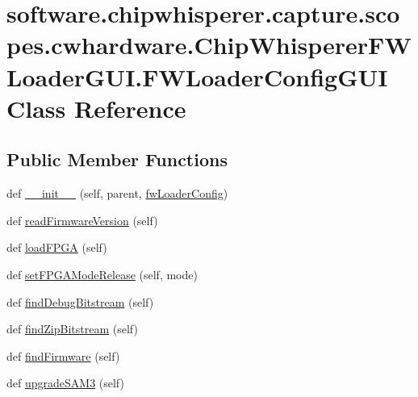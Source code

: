 \hypertarget{classsoftware_1_1chipwhisperer_1_1capture_1_1scopes_1_1cwhardware_1_1ChipWhispererFWLoaderGUI_1_1FWLoaderConfigGUI}{}\section{software.\+chipwhisperer.\+capture.\+scopes.\+cwhardware.\+Chip\+Whisperer\+F\+W\+Loader\+G\+U\+I.\+F\+W\+Loader\+Config\+G\+U\+I Class Reference}
\label{classsoftware_1_1chipwhisperer_1_1capture_1_1scopes_1_1cwhardware_1_1ChipWhispererFWLoaderGUI_1_1FWLoaderConfigGUI}
\subsection*{Public Member Functions}
\begin{DoxyCompactItemize}
\item 
def \hyperlink{classsoftware_1_1chipwhisperer_1_1capture_1_1scopes_1_1cwhardware_1_1ChipWhispererFWLoaderGUI_1_1FWLoaderConfigGUI_a34c2ad3fc05a38243c047aee6386e9a6}{\+\_\+\+\_\+init\+\_\+\+\_\+} (self, parent, \hyperlink{classsoftware_1_1chipwhisperer_1_1capture_1_1scopes_1_1cwhardware_1_1ChipWhispererFWLoaderGUI_1_1FWLoaderConfigGUI_a71542d72bad0a74f3a79ef7c806c0dfb}{fw\+Loader\+Config})
\item 
def \hyperlink{classsoftware_1_1chipwhisperer_1_1capture_1_1scopes_1_1cwhardware_1_1ChipWhispererFWLoaderGUI_1_1FWLoaderConfigGUI_a2ae8c7ea0c1482e5b5e66f9541d24168}{read\+Firmware\+Version} (self)
\item 
def \hyperlink{classsoftware_1_1chipwhisperer_1_1capture_1_1scopes_1_1cwhardware_1_1ChipWhispererFWLoaderGUI_1_1FWLoaderConfigGUI_ae52e067c51a171f9c495af93f86d55fb}{load\+F\+P\+G\+A} (self)
\item 
def \hyperlink{classsoftware_1_1chipwhisperer_1_1capture_1_1scopes_1_1cwhardware_1_1ChipWhispererFWLoaderGUI_1_1FWLoaderConfigGUI_a772e10722e11db9c3a70d17a6c500933}{set\+F\+P\+G\+A\+Mode\+Release} (self, mode)
\item 
def \hyperlink{classsoftware_1_1chipwhisperer_1_1capture_1_1scopes_1_1cwhardware_1_1ChipWhispererFWLoaderGUI_1_1FWLoaderConfigGUI_a513854080cf82c9b8755821158e80f26}{find\+Debug\+Bitstream} (self)
\item 
def \hyperlink{classsoftware_1_1chipwhisperer_1_1capture_1_1scopes_1_1cwhardware_1_1ChipWhispererFWLoaderGUI_1_1FWLoaderConfigGUI_a628d5b2f45b993398b1083dde4b467c2}{find\+Zip\+Bitstream} (self)
\item 
def \hyperlink{classsoftware_1_1chipwhisperer_1_1capture_1_1scopes_1_1cwhardware_1_1ChipWhispererFWLoaderGUI_1_1FWLoaderConfigGUI_ad274bc7a30397d859f006656758fb1da}{find\+Firmware} (self)
\item 
def \hyperlink{classsoftware_1_1chipwhisperer_1_1capture_1_1scopes_1_1cwhardware_1_1ChipWhispererFWLoaderGUI_1_1FWLoaderConfigGUI_a07ab97a2684f788a6a911701f2ce42c3}{upgrade\+S\+A\+M3} (self)
\end{DoxyCompactItemize}
